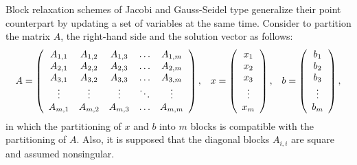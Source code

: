 Block relaxation schemes of Jacobi and Gauss-Seidel type generalize their point
counterpart by updating a set of variables at the same time. Consider
to partition the matrix $A$, the right-hand side and the solution vector
as follows:
\begin{equation}
\label{eq:partition}
A = 
\left(
\begin{array}{c c c c c}
A_{1,1} & A_{1,2} & A_{1,3} & \ldots & A_{1,m} \\
A_{2,1} & A_{2,2} & A_{2,3} & \ldots & A_{2,m} \\
A_{3,1} & A_{3,2} & A_{3,3} & \ldots & A_{3,m} \\
\vdots  & \vdots  & \vdots  & \ddots & \vdots  \\
A_{m,1} & A_{m,2} & A_{m,3} & \ldots & A_{m,m} \\
\end{array}
\right),
  \;\;\;
x = 
\left(
\begin{array}{c c c c c}
x_{1} \\
x_{2} \\
x_{3} \\
\vdots  \\
x_{m}
\end{array}
\right), \;\;\;
b = 
\left(
\begin{array}{c c c c c}
b_{1} \\
b_{2} \\
b_{3} \\
\vdots  \\
b_{m}
\end{array}
\right),
\end{equation}
in which the partitioning of $x$ and $b$ into $m$ blocks is compatible with the partitioning
of $A$. Also, it is supposed that the diagonal blocks $A_{i,i}$ are square
and assumed nonsingular.

